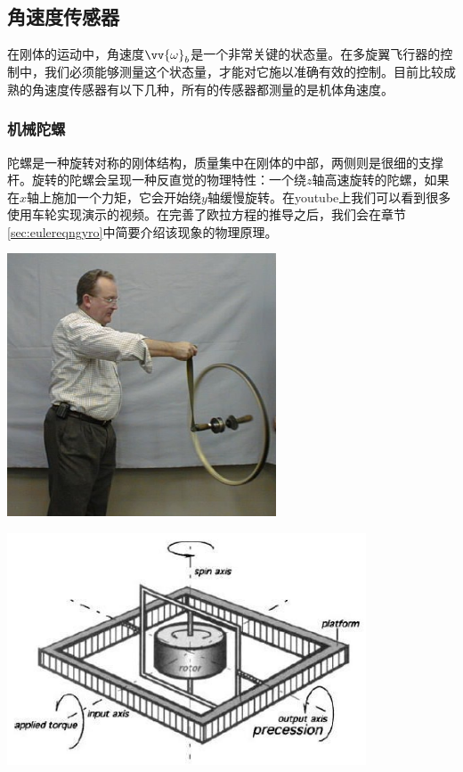 \documentclass[11pt]{article}
\begin{document}
\subsection{角速度传感器}\label{sec:angularsensor}
在刚体的运动中，角速度$\vv{\omega}_b$是一个非常关键的状态量。在多旋翼飞行器的控制中，我们必须能够测量这个状态量，才能对它施以准确有效的控制。目前比较成熟的角速度传感器有以下几种，所有的传感器都测量的是机体角速度。
\subsubsection{机械陀螺}
陀螺是一种旋转对称的刚体结构，质量集中在刚体的中部，两侧则是很细的支撑杆。旋转的陀螺会呈现一种反直觉的物理特性：一个绕$z$轴高速旋转的陀螺，如果在$x$轴上施加一个力矩，它会开始绕$y$轴缓慢旋转。在youtube上我们可以看到很多使用车轮实现演示的视频。在完善了欧拉方程的推导之后，我们会在章节\ref{sec:eulereqngyro}中简要介绍该现象的物理原理。

\begin{center}
\includegraphics[width=0.6\textwidth]{images/BicycleWheelGyro.jpg}
\end{center}

\includegraphics[width=0.8\textwidth]{images/gyroscopeAxes.jpg}
\end{document}
